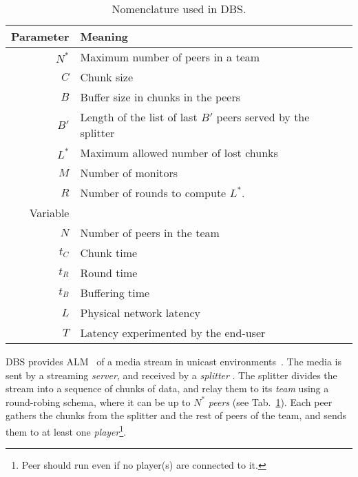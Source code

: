 
\label{sec:DBS}

\begin{table}
  \centering
  \begin{tabular}{rl}
    Parameter & Meaning \\
    \hline
    $N^*$  & Maximum number of peers in a team \\
    $C$    & Chunk size \\
    $B$    & Buffer size in chunks in the peers \\
    $B'$   & Length of the list of last $B'$ peers served by the splitter \\ 
    $L^*$  & Maximum allowed number of lost chunks \\
    $M$    & Number of monitors \\
    $R$    & Number of rounds to compute $L^*$. \\
    Variable & \\
    \hline
    $N$    & Number of peers in the team \\
    $t_C$  & Chunk time \\
    $t_R$  & Round time \\
    $t_B$  & Buffering time \\
    $L$    & Physical network latency \\
    $T$    & Latency experimented by the end-user
  \end{tabular}
  \caption{Nomenclature used in DBS.\label{tab:DBS_nomenclature}}
\end{table}

DBS provides ALM~\cite{banerjee2002scalable} of a media stream in
unicast environments~\cite{comer2003computer}. The media is sent by a
streaming \emph{server}, and received by a \emph{splitter} . The splitter divides the stream into a
sequence of chunks of data, and relay them to its \emph{team} using a
round-robing schema, where it can be up to $N^*$ \emph{peers} (see
Tab.~\ref{tab:DBS_nomenclature}). Each peer gathers the chunks from
the splitter and the rest of peers of the team, and sends them to at
least one \emph{player}\footnote{Peer should run even if no player(s)
  are connected to it.}.

\begin{comment}
In single layered streams\footnote{Each layer of a
  scalable stream is received by a different peer attached to the same
  player capable or render scalable media.}, each peer is spawned by a
player (normal users should not run peers directly).
\end{comment}

\begin{comment}
/* quitar: We define the set of teams as
$\{T\}$,
and enumerate the peers in the team $T$ as $T=\{P_1,\cdots,P_{|T|}\}$. */
\end{comment}
